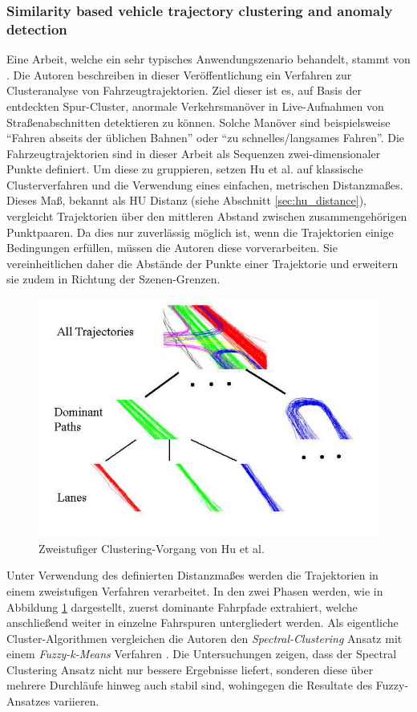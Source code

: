 \subsubsection*{Similarity based vehicle trajectory clustering and anomaly detection}
Eine Arbeit, welche ein sehr typisches Anwendungszenario behandelt, stammt von \cite[]{Hu2005}. Die Autoren
beschreiben in dieser Veröffentlichung ein Verfahren zur Clusteranalyse von Fahrzeugtrajektorien. Ziel dieser
ist es, auf Basis der entdeckten Spur-Cluster, anormale Verkehrsmanöver in Live-Aufnahmen von Straßenabschnitten
detektieren zu können. Solche Manöver sind beispielsweise ``Fahren abseits der üblichen Bahnen'' oder
``zu schnelles/langsames Fahren''.
Die Fahrzeugtrajektorien sind in dieser Arbeit als Sequenzen zwei-dimensionaler Punkte definiert.
Um diese zu gruppieren, setzen Hu et al. auf klassische Clusterverfahren und die Verwendung eines
einfachen, metrischen Distanzmaßes. Dieses Maß, bekannt als HU Distanz (siehe Abschnitt \ref{sec:hu_distance}),
vergleicht Trajektorien über den mittleren Abstand zwischen zusammengehörigen Punktpaaren. 
Da dies nur zuverlässig möglich ist, wenn die Trajektorien einige Bedingungen erfüllen, müssen die
Autoren diese vorverarbeiten. Sie vereinheitlichen daher die Abstände der Punkte einer Trajektorie und erweitern
sie zudem in Richtung der Szenen-Grenzen.

\begin{figure}[H]
    \centering
    \includegraphics[width=0.5\linewidth]{../resources/img/RelatedWork/Fu_HierarchicalClustering}
    \caption[Zweistufiger Clustering-Vorgang von Hu et al.]{Zweistufiger Clustering-Vorgang von Hu et al. \cite[]{Hu2005}}
    \label{fig:relw_hu_two_step_cluster}
\end{figure}

Unter Verwendung des definierten Distanzmaßes werden die Trajektorien in einem zweistufigen Verfahren verarbeitet.
In den zwei Phasen werden, wie in Abbildung \ref{fig:relw_hu_two_step_cluster} dargestellt, zuerst dominante
Fahrpfade extrahiert, welche anschließend weiter in einzelne Fahrspuren untergliedert werden.
Als eigentliche Cluster-Algorithmen vergleichen die Autoren den \textit{Spectral-Clustering} Ansatz \cite[]{Ng2002}
mit einem \textit{Fuzzy-k-Means} Verfahren \cite[]{xie1991validity}.
Die Untersuchungen zeigen, dass der Spectral Clustering Ansatz nicht nur bessere Ergebnisse liefert, sonderen diese
über mehrere Durchläufe hinweg auch stabil sind, wohingegen die Resultate des Fuzzy-Ansatzes variieren.


